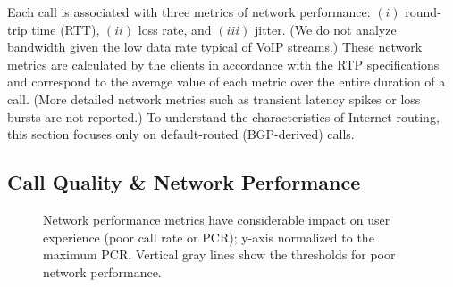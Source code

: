 



Each call is associated with three metrics of network 
performance: $\left(i\right)$ round-trip time (RTT), 
$\left(ii\right)$ loss rate, and $\left(iii\right)$ jitter. 
(We do not analyze bandwidth given the low data rate 
typical of VoIP streams.) 
These network metrics are calculated by the \skype 
clients in accordance with the RTP 
specifications~\cite{rtp-rfc3550} and correspond to 
the average value of each metric over the entire duration 
of a call. 
(More detailed network metrics such as transient latency 
spikes or loss bursts are not reported.) 
To understand the characteristics of \direct Internet routing,
this section focuses only on default-routed (BGP-derived) 
calls.


\subsection{Call Quality \& Network Performance}
\label{subsec:measurement:voip:quality}

\begin{figure}[t!]
\centering
{}
\caption{Network performance metrics have considerable 
impact on user experience (poor call rate or PCR); 
y-axis normalized to the maximum PCR. Vertical gray lines 
show the thresholds for poor network performance.}
\label{fig:pcr}
\end{figure}


